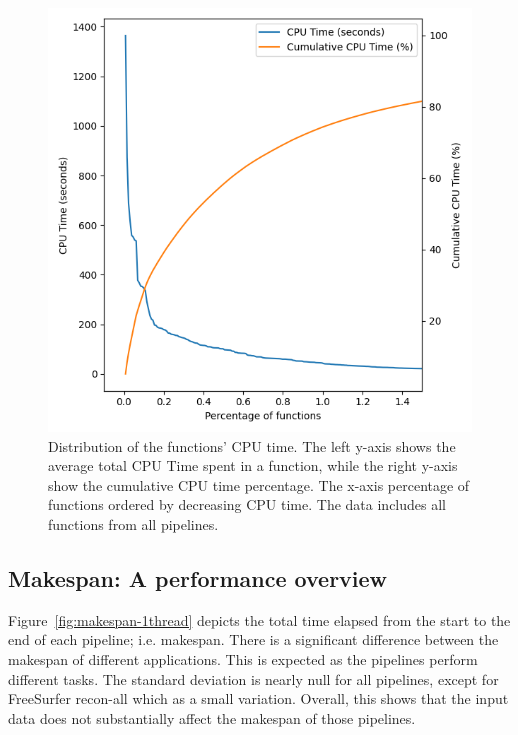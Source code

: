 \documentclass[conference]{IEEEtran}
\begin{document}
\begin{figure}[ht]
	\centering
	\includegraphics[width=\linewidth]{figures/global-longtail.png}
	\caption{Distribution of the functions' CPU time. The left y-axis shows the average total CPU Time spent in a function, while the right y-axis show the cumulative CPU time percentage. The x-axis percentage of functions ordered by decreasing CPU time. The data includes all functions from all pipelines.}
	\label{fig:long-tail-distribution}
\end{figure}
				
\subsection{Makespan: A performance overview}
Figure~\ref{fig:makespan-1thread} depicts the total time elapsed from the start to the end of each pipeline; i.e. makespan. There is a significant difference between the makespan of different applications. This is expected as the pipelines perform different tasks. The standard deviation is nearly null for all pipelines, except for FreeSurfer recon-all which as a small variation. Overall, this shows that the input data does not substantially affect the makespan of those pipelines.
			
\end{document}

